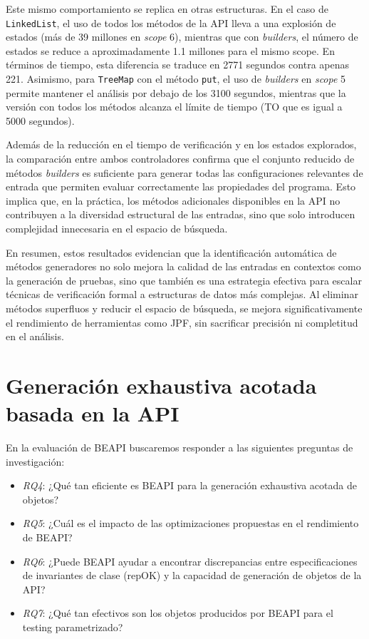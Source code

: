 Este mismo comportamiento se replica en otras estructuras. En el caso de \texttt{LinkedList}, 
el uso de todos los métodos de la API lleva a una explosión de estados (más de 39 millones en 
\textit{scope} 6), mientras que con \emph{builders}, el número de estados se reduce a aproximadamente 
1.1 millones para el mismo scope. En términos de tiempo, esta diferencia se traduce en 2771 segundos contra apenas 221. 
Asimismo, para \texttt{TreeMap} con el método \texttt{put}, el uso de \emph{builders} en 
\textit{scope} 5 permite mantener el análisis por debajo de los 3100 segundos, mientras que 
la versión con todos los métodos alcanza el límite de tiempo (TO que es igual a 5000 segundos).

Además de la reducción en el tiempo de verificación y en los estados explorados, la comparación 
entre ambos controladores confirma que el conjunto reducido de métodos \emph{builders} es suficiente 
para generar todas las configuraciones relevantes de entrada que permiten evaluar correctamente 
las propiedades del programa. Esto implica que, en la práctica, los métodos adicionales disponibles 
en la API no contribuyen a la diversidad estructural de las entradas, sino que solo introducen 
complejidad innecesaria en el espacio de búsqueda.

En resumen, estos resultados evidencian que la identificación automática de métodos generadores no 
solo mejora la calidad de las entradas en contextos como la generación de pruebas, sino que también 
es una estrategia efectiva para escalar técnicas de verificación formal a estructuras de datos más 
complejas. Al eliminar métodos superfluos y reducir el espacio de búsqueda, se mejora significativamente 
el rendimiento de herramientas como JPF, sin sacrificar precisión ni completitud en el análisis.




\section{Generación exhaustiva acotada basada en la API}
\label{sec:experimentalBeapi}

En la evaluación de BEAPI buscaremos responder a las siguientes preguntas de
investigación:

\begin{itemize}
\item \emph{RQ4}: ¿Qué tan eficiente es BEAPI para la generación exhaustiva                                                                                       
    acotada de objetos?
\item\emph{RQ5}: ¿Cuál es el impacto de las optimizaciones propuestas en el
    rendimiento de BEAPI?
\item\emph{RQ6}: ¿Puede BEAPI ayudar a encontrar discrepancias entre
    especificaciones de invariantes de clase (repOK) y la capacidad de generación de objetos de la API?
\item\emph{RQ7}: ¿Qué tan efectivos son los objetos producidos por BEAPI para el
    testing parametrizado?  
\end{itemize}

